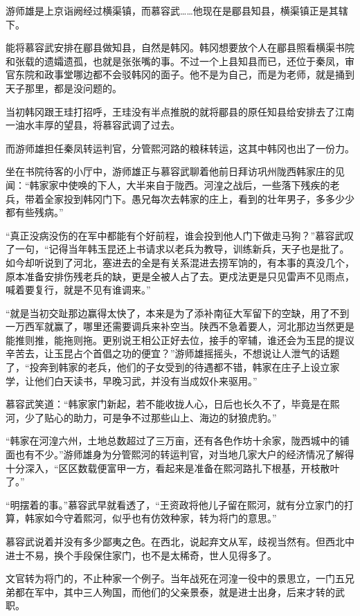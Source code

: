 游师雄是上京诣阙经过横渠镇，而慕容武……他现在是郿县知县，横渠镇正是其辖下。

能将慕容武安排在郿县做知县，自然是韩冈。韩冈想要放个人在郿县照看横渠书院和张载的遗孀遗孤，也就是张张嘴的事。不过一个上县知县而已，还位于秦凤，审官东院和政事堂哪边都不会驳韩冈的面子。他不是为自己，而是为老师，就是捅到天子那里，都是没问题的。

当初韩冈跟王珪打招呼，王珪没有半点推脱的就将郿县的原任知县给安排去了江南一油水丰厚的望县，将慕容武调了过去。

而游师雄担任秦凤转运判官，分管熙河路的粮秣转运，这其中韩冈也出了一份力。

坐在书院待客的小厅中，游师雄正与慕容武聊着他前日拜访巩州陇西韩家庄的见闻：“韩家家中使唤的下人，大半来自于陇西。河湟之战后，一些落下残疾的老兵，带着全家投到韩冈门下。愚兄每次去韩家的庄上，看到的壮年男子，多多少少都有些残病。”

“真正没病没伤的在军中都能有个好前程，谁会投到他人门下做走马狗？”慕容武叹了一句，“记得当年韩玉昆还上书请求以老兵为教导，训练新兵，天子也是批了。如今却听说到了河北，塞进去的全是有关系混进去捞军饷的，有本事的真没几个，原本准备安排伤残老兵的缺，更是全被人占了去。更戍法更是只见雷声不见雨点，喊着要复行，就是不见有谁调来。”

“就是当初交趾那边赢得太快了，本来是为了添补南征大军留下的空缺，用了不到一万西军就赢了，哪里还需要调兵来补空当。陕西不急着要人，河北那边当然更是能推则推，能拖则拖。更别说王相公正好去位，接手的宰辅，谁还会为玉昆的提议辛苦去，让玉昆占个首倡之功的便宜？”游师雄摇摇头，不想说让人泄气的话题了，“投奔到韩家的老兵，他们的子女受到的待遇都不错，韩家在庄子上设立家学，让他们白天读书，早晚习武，并没有当成奴仆来驱用。”

慕容武笑道：“韩家家门新起，若不能收拢人心，日后也长久不了，毕竟是在熙河，少了贴心的助力，可是争不过那些山上、海边的豺狼虎豹。”

“韩家在河湟六州，土地总数超过了三万亩，还有各色作坊十余家，陇西城中的铺面也有不少。”游师雄身为分管熙河的转运判官，对当地几家大户的经济情况了解得十分深入，“区区数载便富甲一方，看起来是准备在熙河路扎下根基，开枝散叶了。”

“明摆着的事。”慕容武早就看透了，“王资政将他儿子留在熙河，就有分立家门的打算，韩家如今守着熙河，似乎也有仿效种家，转为将门的意思。”

慕容武说着并没有多少鄙夷之色。在西北，说起弃文从军，歧视当然有。但西北中进士不易，换个手段保住家门，也不是太稀奇，世人见得多了。

文官转为将门的，不止种家一个例子。当年战死在河湟一役中的景思立，一门五兄弟都在军中，其中三人殉国，而他们的父亲景泰，就是进士出身，后来才转的武职。

